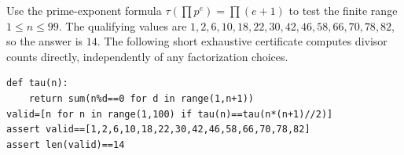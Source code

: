 Use the prime-exponent formula $\tau(\prod p^e)=\prod(e+1)$ to test the finite range $1\le n\le99$. The qualifying values are $1,2,6,10,18,22,30,42,46,58,66,70,78,82$, so the answer is $\boxed{14}$. The following short exhaustive certificate computes divisor counts directly, independently of any factorization choices.\begin{verbatim}
def tau(n):
    return sum(n%d==0 for d in range(1,n+1))
valid=[n for n in range(1,100) if tau(n)==tau(n*(n+1)//2)]
assert valid==[1,2,6,10,18,22,30,42,46,58,66,70,78,82]
assert len(valid)==14
\end{verbatim}
